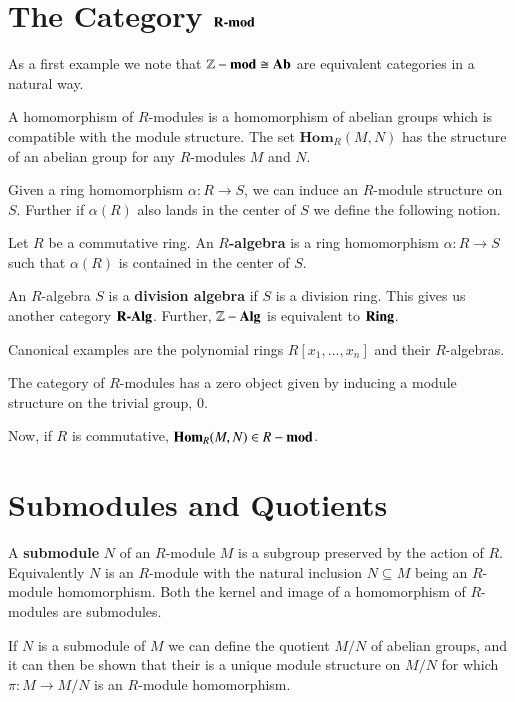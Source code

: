 \documentclass[12pt, a4paper, oneside, openright, titlepage]{book}
\begin{document}
\section{The Category $\normalfont\textbf{R-mod}$}

As a first example we note that $\mathbb Z-\normalfont\textbf{mod}\cong \normalfont\textbf{Ab}$ are equivalent categories in a natural way.

A homomorphism of $R$-modules is a homomorphism of abelian groups which is compatible with the module structure. The set $\mathbf{Hom}_R(M,N)$ has the structure of an abelian group for any $R$-modules $M$ and $N$.

Given a ring homomorphism $\alpha:R\rightarrow S$, we can induce an $R$-module structure on $S$. Further if $\alpha(R)$ also lands in the center of $S$ we define the following notion.

\begin{defn}
    Let $R$ be a commutative ring. An \textbf{$R$-algebra} is a ring homomorphism $\alpha:R\rightarrow S$ such that $\alpha(R)$ is contained in the center of $S$.
\end{defn}

An $R$-algebra $S$ is a \textbf{division algebra} if $S$ is a division ring. This gives us another category $\normalfont\textbf{R-Alg}$. Further, $\mathbb Z-\normalfont\textbf{Alg}$ is equivalent to $\normalfont\textbf{Ring}$.

Canonical examples are the polynomial rings $R[x_1,...,x_n]$ and their $R$-algebras.

The category of $R$-modules has a zero object given by inducing a module structure on the trivial group, $0$. 

Now, if $R$ is commutative, $\mathbf{Hom}_R(M,N) \in R-\normalfont\textbf{mod}$. 


\section{Submodules and Quotients}

A \textbf{submodule} $N$ of an $R$-module $M$ is a subgroup preserved by the action of $R$. Equivalently $N$ is an $R$-module with the natural inclusion $N \subseteq M$ being an $R$-module homomorphism. Both the kernel and image of a homomorphism of $R$-modules are submodules.

If $N$ is a submodule of $M$ we can define the quotient $M/N$ of abelian groups, and it can then be shown that their is a unique module structure on $M/N$ for which $\pi:M\rightarrow M/N$ is an $R$-module homomorphism.
\end{document}

